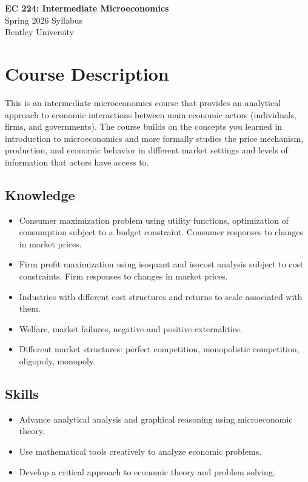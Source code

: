\documentclass[11pt,letterpaper]{article}
\begin{document}
\begin{center}
{\LARGE\bfseries\color{bentleyblue} EC 224: Intermediate Microeconomics}\\[0.3cm]
{\Large Spring 2026 Syllabus}\\[0.5cm]
{\large Bentley University}
\end{center}

\vspace{0.5cm}

\section*{Course Description}

This is an intermediate microeconomics course that provides an analytical approach to economic interactions between main economic actors (individuals, firms, and governments). The course builds on the concepts you learned in introduction to microeconomics and more formally studies the price mechanism, production, and economic behavior in different market settings and levels of information that actors have access to.

\subsection*{Knowledge}
\begin{itemize}
    \item Consumer maximization problem using utility functions, optimization of consumption subject to a budget constraint. Consumer responses to changes in market prices.
    \item Firm profit maximization using isoquant and isocost analysis subject to cost constraints. Firm responses to changes in market prices.
    \item Industries with different cost structures and returns to scale associated with them.
    \item Welfare, market failures, negative and positive externalities.
    \item Different market structures: perfect competition, monopolistic competition, oligopoly, monopoly.
\end{itemize}

\subsection*{Skills}
\begin{itemize}
    \item Advance analytical analysis and graphical reasoning using microeconomic theory.
    \item Use mathematical tools creatively to analyze economic problems.
    \item Develop a critical approach to economic theory and problem solving.
\end{itemize}
\end{document}
